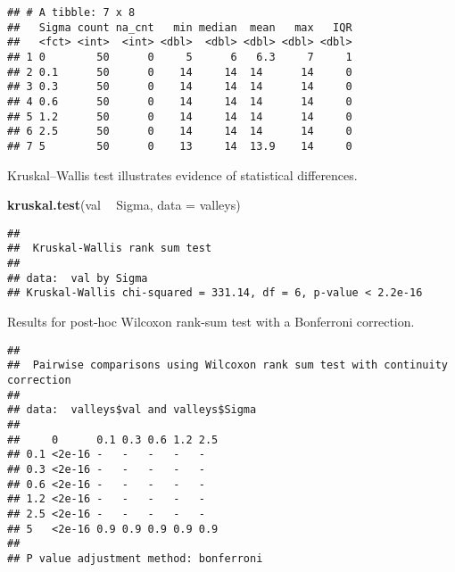 \documentclass[]{book}
\newenvironment{Shaded}{\begin{snugshade}}{\end{snugshade}}
\newcommand{\DataTypeTok}[1]{\textcolor[rgb]{0.13,0.29,0.53}{#1}}
\newcommand{\KeywordTok}[1]{\textcolor[rgb]{0.13,0.29,0.53}{\textbf{#1}}}
\newcommand{\NormalTok}[1]{#1}
\newcommand{\OperatorTok}[1]{\textcolor[rgb]{0.81,0.36,0.00}{\textbf{#1}}}
\newcommand{\OtherTok}[1]{\textcolor[rgb]{0.56,0.35,0.01}{#1}}
\newcommand{\StringTok}[1]{\textcolor[rgb]{0.31,0.60,0.02}{#1}}
\begin{document}
\begin{verbatim}
## # A tibble: 7 x 8
##   Sigma count na_cnt   min median  mean   max   IQR
##   <fct> <int>  <int> <dbl>  <dbl> <dbl> <dbl> <dbl>
## 1 0        50      0     5      6   6.3     7     1
## 2 0.1      50      0    14     14  14      14     0
## 3 0.3      50      0    14     14  14      14     0
## 4 0.6      50      0    14     14  14      14     0
## 5 1.2      50      0    14     14  14      14     0
## 6 2.5      50      0    14     14  14      14     0
## 7 5        50      0    13     14  13.9    14     0
\end{verbatim}

Kruskal--Wallis test illustrates evidence of statistical differences.

\begin{Shaded}
\begin{Highlighting}[]
\KeywordTok{kruskal.test}\NormalTok{(val }\OperatorTok{~}\StringTok{ }\NormalTok{Sigma, }\DataTypeTok{data =}\NormalTok{ valleys)}
\end{Highlighting}
\end{Shaded}

\begin{verbatim}
## 
##  Kruskal-Wallis rank sum test
## 
## data:  val by Sigma
## Kruskal-Wallis chi-squared = 331.14, df = 6, p-value < 2.2e-16
\end{verbatim}

Results for post-hoc Wilcoxon rank-sum test with a Bonferroni correction.

\begin{Shaded}
\end{Shaded}

\begin{verbatim}
## 
##  Pairwise comparisons using Wilcoxon rank sum test with continuity correction 
## 
## data:  valleys$val and valleys$Sigma 
## 
##     0      0.1 0.3 0.6 1.2 2.5
## 0.1 <2e-16 -   -   -   -   -  
## 0.3 <2e-16 -   -   -   -   -  
## 0.6 <2e-16 -   -   -   -   -  
## 1.2 <2e-16 -   -   -   -   -  
## 2.5 <2e-16 -   -   -   -   -  
## 5   <2e-16 0.9 0.9 0.9 0.9 0.9
## 
## P value adjustment method: bonferroni
\end{verbatim}
\end{document}
